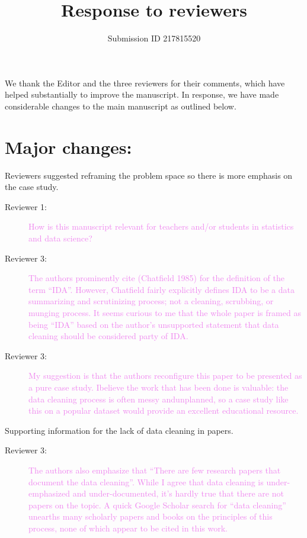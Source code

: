 \documentclass[12pt,a4paper,]{article}
\title{Response to reviewers}
\date{Submission ID 217815520}
\begin{document}
\vspace*{-2cm}
\begin{snugshade}\sffamily
\maketitle
\end{snugshade}\vspace*{0.5cm}


We thank the Editor and the three reviewers for their comments, which have helped substantially to improve the manuscript. In response, we have made considerable changes to the main manuscript as outlined below.

\section*{Major changes:}

Reviewers suggested reframing the problem space so there is more emphasis on the case study.

\begin{description}
\item[Reviewer 1:] \textcolor{violet}{How is this manuscript relevant for teachers and/or students in statistics and data science?}
\item[Reviewer 3:] \textcolor{violet}{The authors prominently cite (Chatfield 1985) for the definition of the term “IDA”. However, Chatfield fairly explicitly defines IDA to be a data summarizing and scrutinizing process; not a cleaning, scrubbing, or munging process. It seems curious to me that the whole paper is framed as being “IDA” based on the author’s unsupported statement that data cleaning should be considered party of IDA.}
\item[Reviewer 3:] \textcolor{violet}{My suggestion is that the authors reconfigure this paper to be presented as a pure case study. Ibelieve the work that has been done is valuable: the data cleaning process is often messy andunplanned, so a case study like this on a popular dataset would provide an excellent educational resource.}
\end{description}

Supporting information for the lack of data cleaning in papers.

\begin{description}
\item[Reviewer 3:] \textcolor{violet}{The authors also emphasize that “There are few research papers that document the data cleaning”. While I agree that data cleaning is under-emphasized and under-documented, it’s hardly true that there are not papers on the topic. A quick Google Scholar search for “data cleaning” unearths many scholarly papers and books on the principles of this process, none of which appear to be cited in this work.}
\end{description}
\end{document}
